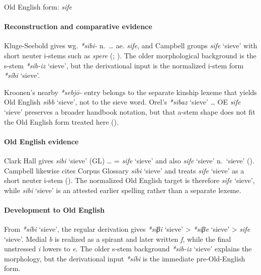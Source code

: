 \documentclass[
  british,
  a4paper,
]{article}
\providecommand{\Recon}[1]{\emph{*#1}}
\begin{document}
Old English form: \emph{sife}

\paragraph{Reconstruction and comparative
evidence}\label{reconstruction-and-comparative-evidence-111}

Kluge-Seebold gives wg. \emph{*sibi-} n.~\ldots{} ae. \emph{sife}, and
Campbell groups {\emph{sife}} `sieve' with short neuter i-stems such as
\emph{spere} (;
). The older
morphological background is the s-stem \Recon{sib-iz} `sieve', but the
derivational input is the normalized i-stem form \Recon{síbi} `sieve'.

Kroonen's nearby \emph{*sebjō-} entry belongs to the separate kinship
lexeme that yields Old English {\emph{sibb}} `sieve', not to the sieve
word. Orel's \Recon{sibaz} `sieve' \ldots{} OE {\emph{sife}} `sieve'
preserves a broader handbook notation, but that a-stem shape does not
fit the Old English form treated here ().

\paragraph{Old English evidence}\label{old-english-evidence-113}

Clark Hall gives {\emph{sibi}} `sieve' (GL) \ldots{} = {\emph{sife}}
`sieve' and also {\emph{sife}} `sieve' n.~`sieve'
(). Campbell likewise
cites Corpus Glossary \emph{sibi} `sieve' and treats \emph{sife} `sieve'
as a short neuter i-stem (). The normalized Old English target is therefore
\emph{sife} `sieve', while \emph{sibi} `sieve' is an attested earlier
spelling rather than a separate lexeme.

\paragraph{Development to Old
English}\label{development-to-old-english-111}

From \Recon{síbi} `sieve', the regular derivation gives \Recon{síβi}
`sieve' \textgreater{} \Recon{síβe} `sieve' \textgreater{} {\emph{sife}}
`sieve'. Medial \emph{b} is realized as a spirant and later written
\emph{f}, while the final unstressed \emph{i} lowers to \emph{e}. The
older s-stem background \Recon{sib-iz} `sieve' explains the morphology,
but the derivational input \Recon{síbi} is the immediate pre-Old-English
form.
\end{document}
